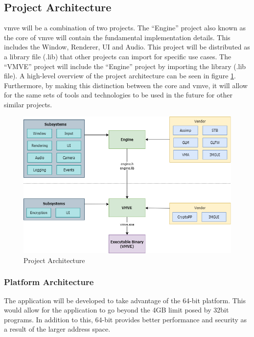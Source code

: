 \documentclass[11pt]{article}
\begin{document}
\subsection{Project Architecture}

\gls*{vmve} will be a combination of two projects. The ``Engine'' project also
known as the core of \gls*{vmve} will contain the fundamental implementation
details. This includes the Window, Renderer, UI and Audio. This project will be
distributed as a library file (.lib) that other projects can import for specific
use cases. The ``VMVE'' project will include the ``Engine'' project by importing
the library (.lib file). A high-level overview of the project architecture can
be seen in figure \ref{fig:projarch}. Furthermore, by making this distinction
between the core and \gls*{vmve}, it will allow for the same sets of tools and
technologies to be used in the future for other similar projects.

\begin{figure}[H]
  \centering
  \includegraphics[width=\textwidth]{images/project_architecture.png}
  \caption{Project Architecture}
  \label{fig:projarch}
\end{figure}

\subsubsection{Platform Architecture}
The application will be developed to take advantage of the 64-bit platform. This
would allow for the application to go beyond the 4GB limit posed by 32bit
programs. In addition to this, 64-bit provides better performance and security 
as a result of the larger address space.
\end{document}
